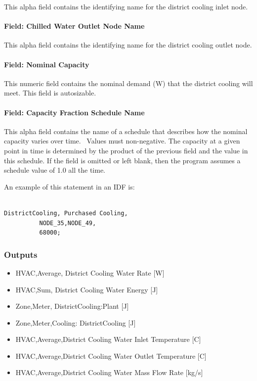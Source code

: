 This alpha field contains the identifying name for the district cooling inlet node.

\paragraph{Field: Chilled Water Outlet Node Name}\label{field-chilled-water-outlet-node-name-10}

This alpha field contains the identifying name for the district cooling outlet node.

\paragraph{Field: Nominal Capacity}\label{field-nominal-capacity-10}

This numeric field contains the nominal demand (W) that the district cooling will meet. This field is autosizable.

\paragraph{Field: Capacity Fraction Schedule Name}\label{field-capacity-fraction-schedule-name}

This alpha field contains the name of a schedule that describes how the nominal capacity varies over time.~ Values must non-negative. The capacity at a given point in time is determined by the product of the previous field and the value in this schedule. If the field is omitted or left blank, then the program assumes a schedule value of 1.0 all the time.

An example of this statement in an IDF is:

\begin{lstlisting}

DistrictCooling, Purchased Cooling,
          NODE_35,NODE_49,
          68000;
\end{lstlisting}

\subsubsection{Outputs}\label{outputs-14-003}

\begin{itemize}
    \item
    HVAC,Average, District Cooling Water Rate {[}W{]}
    \item
    HVAC,Sum, District Cooling Water Energy {[}J{]}
    \item
    Zone,Meter, DistrictCooling:Plant {[}J{]}
    \item
    Zone,Meter,Cooling: DistrictCooling {[}J{]}
    \item
    HVAC,Average,District Cooling Water Inlet Temperature {[}C{]}
    \item
    HVAC,Average,District Cooling Water Outlet Temperature {[}C{]}
    \item
    HVAC,Average,District Cooling Water Mass Flow Rate {[}kg/s{]}
\end{itemize}

